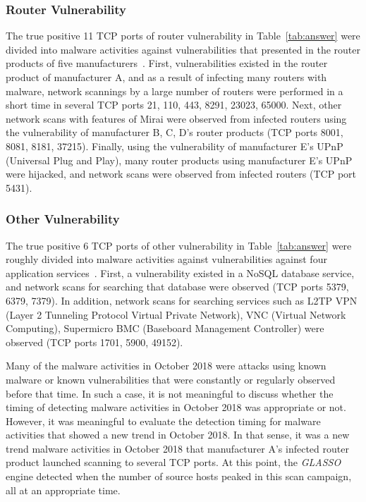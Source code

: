 \documentclass[conference]{IEEEtran}
\begin{document}
\subsubsection{Router Vulnerability}
The true positive 11 TCP ports of router vulnerability in Table~\ref{tab:answer} were divided into malware activities against vulnerabilities that presented in the router products of five manufacturers~\cite{Huawei,Netlab_BCM,Netlab_MikroTik}.
First, vulnerabilities existed in the router product of manufacturer A, and as a result of infecting many routers with malware, network scannings by a large number of routers were performed in a short time in several TCP ports 21, 110, 443, 8291, 23023, 65000.
Next, other network scans with features of Mirai were observed from infected routers using the vulnerability of manufacturer B, C, D's router products (TCP ports 8001, 8081, 8181, 37215).
Finally, using the vulnerability of manufacturer E's UPnP (Universal Plug and Play), many router products using manufacturer E's UPnP were hijacked, and network scans were observed from infected routers (TCP port 5431).



\subsubsection{Other Vulnerability}
The true positive 6 TCP ports of other vulnerability in Table~\ref{tab:answer} were roughly divided into malware activities against vulnerabilities against four application services~\cite{Imperva}.
First, a vulnerability existed in a NoSQL database service, and network scans for searching that database were observed (TCP ports 5379, 6379, 7379).
In addition, network scans for searching services such as L2TP VPN (Layer 2 Tunneling Protocol Virtual Private Network), VNC (Virtual Network Computing), Supermicro BMC (Baseboard Management Controller) were observed (TCP ports 1701, 5900, 49152).


Many of the malware activities in October 2018 were attacks using known malware or known vulnerabilities that were constantly or regularly observed before that time.
In such a case, it is not meaningful to discuss whether the timing of detecting malware activities in October 2018 was appropriate or not.
However, it was meaningful to evaluate the detection timing for malware activities that showed a new trend in October 2018.
In that sense, it was a new trend malware activities in October 2018 that manufacturer A's infected router product launched scanning to several TCP ports.
At this point, the {\it GLASSO} engine detected when the number of source hosts peaked in this scan campaign, all at an appropriate time.
\end{document}
